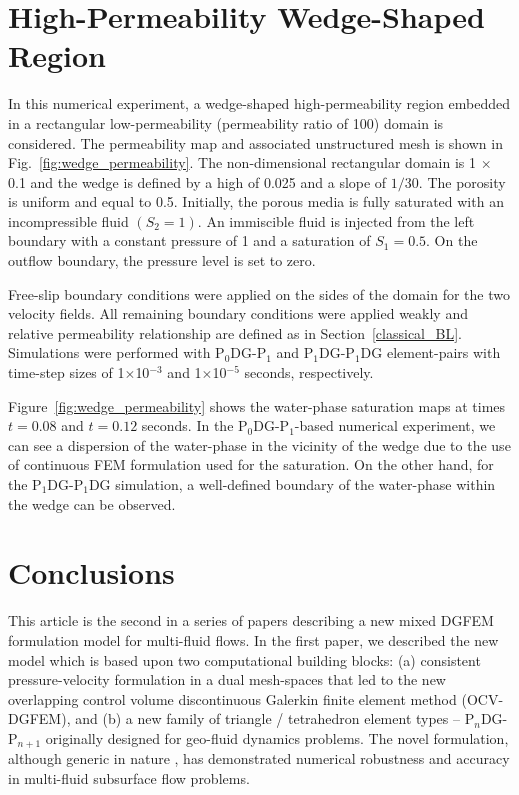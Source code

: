 \documentclass[preprint,authoryear,12pt]{elsarticle}
\newcommand{\PN}[2][error]{P$_{#1}$DG-P$_{#2}$}
\begin{document}
\section{High-Permeability Wedge-Shaped Region}\label{res4}
In this numerical experiment, a wedge-shaped high-permeability region embedded in a rectangular low-permeability (permeability ratio of 100) domain is considered. The permeability map and associated unstructured mesh is shown in Fig.~\ref{fig:wedge_permeability}. The non-dimensional rectangular domain is 1 $\times$ 0.1 and the wedge is defined by a high of 0.025 and a slope of $1/30$. The porosity is uniform and equal to 0.5. Initially, the porous media is fully saturated with an incompressible fluid $\left(S_{2}=1\right)$. An immiscible fluid is injected from the left boundary with a constant pressure of 1 and a saturation of $S_{1}=0.5$. On the outflow boundary, the pressure level is set to zero.

Free-slip boundary conditions were applied on the sides of the domain for the two velocity fields. All remaining boundary conditions were applied weakly and relative permeability relationship are defined as in Section~\ref{classical_BL}. Simulations were performed with \PN[0]{1} and \PN[1]{1}DG element-pairs with time-step sizes of 1$\times$10$^{-3}$ and 1$\times$10$^{-5}$ seconds, respectively.

Figure~\ref{fig:wedge_permeability} shows the water-phase saturation maps at times $t=0.08$ and $t=0.12$ seconds. In the \PN[0]{1}-based numerical experiment, we can see a dispersion of the water-phase in the vicinity of the wedge due to the use of continuous FEM formulation used for the saturation. On the other hand, for the \PN[1]{1}DG simulation, a well-defined boundary of the water-phase within the wedge can be observed. %

\section{Conclusions}\label{conc}
This article is the second in a series of papers describing a new mixed DGFEM formulation model for multi-fluid flows. In the first paper, we described the new model which is based upon two computational building blocks: (a) consistent pressure-velocity formulation in a dual mesh-spaces that led to the new overlapping control volume discontinuous Galerkin finite element method (OCV-DGFEM), and (b) a new family of triangle / tetrahedron element types -- \PN[n]{n+1} originally designed for geo-fluid dynamics problems. The novel formulation, although generic in nature \citep[thus not restricted to porous media applications as demonstrated by][for interface tracking problems]{pavlidis_2013b,pavlidis_2013c}, has demonstrated numerical robustness and accuracy in multi-fluid subsurface flow problems. 
\end{document}
